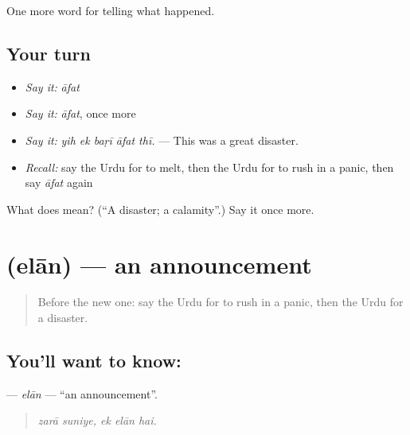 \begin{grammarlens}[title={What you've built}]
One more word for telling what happened.
\end{grammarlens}

\subsection*{Your turn}
\begin{itemize}
\raggedright
  \item \emph{Say it:} \emph{āfat}
  \item \emph{Say it:} \emph{āfat}, once more
  \item \emph{Say it:} \emph{yih ek baṛī āfat thī.} — This was a great disaster.
  \item \emph{Recall:} say the Urdu for to melt, then the Urdu for to rush in a panic, then say \emph{āfat} again
\end{itemize}

\begin{tcolorbox}[breakable,colback=teal!4,colframe=teal!35!black,title={Before you move on}]
What does  mean? (\textquotedblleft{}A disaster; a calamity\textquotedblright{}.) Say it once more.
\end{tcolorbox}
\section[\texorpdfstring{\ur{اعلان} (elān)}{اعلان (elān)}]{ (elān) — an announcement}

\label{lesson:UR-C290-elan}



\begin{quote}
Before the new one: say the Urdu for to rush in a panic, then the Urdu for a disaster.
\end{quote}

\subsection*{You'll want to know: }
\textbf{} — \emph{elān} — \textquotedblleft{}an announcement\textquotedblright{}.

\begin{quote}
    
\end{quote}

\begin{quote}
\emph{zarā suniye, ek elān hai.}
\end{quote}

